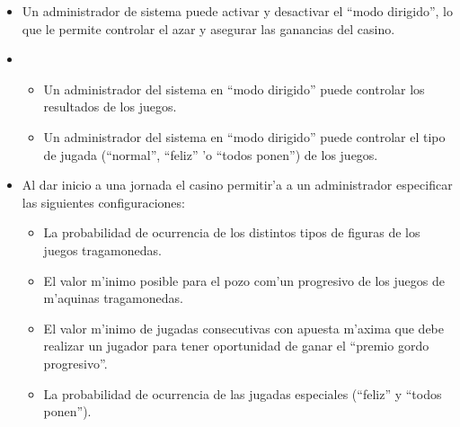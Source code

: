 \begin{itemize}

\item {} 

    Un administrador de sistema puede activar y desactivar el ``modo dirigido'', lo que le permite controlar el azar y asegurar las ganancias del casino.

\item {}

    \begin{itemize}
        \item Un administrador del sistema en ``modo dirigido'' puede controlar los resultados de los juegos.
        \item Un administrador del sistema en ``modo dirigido'' puede controlar el tipo de jugada (``normal'', ``feliz'' 'o ``todos ponen'') de los juegos.
    \end{itemize}

\item {}

    Al dar inicio a una jornada el casino permitir'a a un administrador especificar las siguientes configuraciones:
    \begin{itemize}
        \item La probabilidad de ocurrencia de los distintos tipos de figuras de los juegos tragamonedas.
        \item El valor m'inimo posible para el pozo com'un progresivo de los juegos de m'aquinas tragamonedas.
        \item El valor m'inimo de jugadas consecutivas con apuesta m'axima que debe realizar un jugador para tener oportunidad de ganar el ``premio gordo progresivo''.
        \item La probabilidad de ocurrencia de las jugadas especiales (``feliz'' y ``todos ponen'').
    \end{itemize}



\end{itemize}
